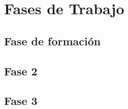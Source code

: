\chapter{Fases de Trabajo}
\label{sec:fases-trabajo}

\section{Fase de formación}
\label{subsec:formacion}

\section{Fase 2}
\label{subsec:fase2}

\section{Fase 3}
\label{subsec:fase2}
